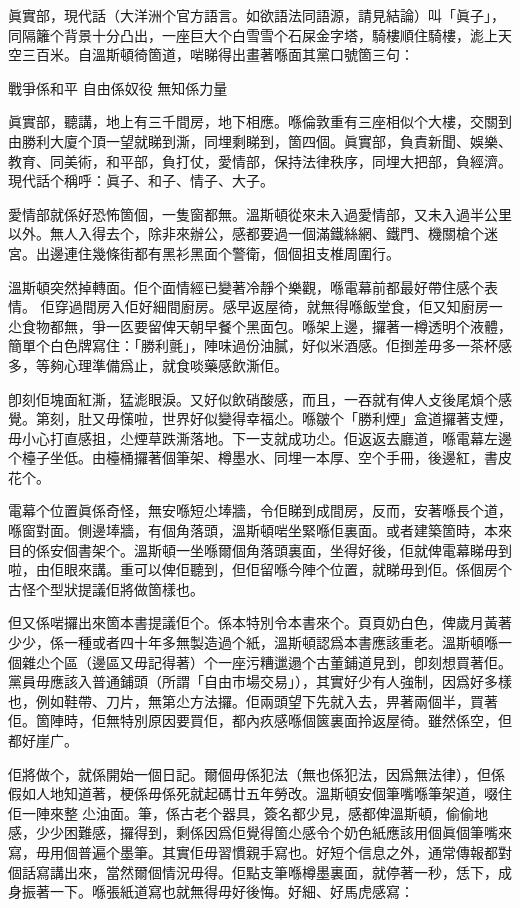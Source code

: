 眞實部，現代話（大洋洲个官方語言。如欲語法同語源，請見結論）叫「眞子」，同隔籬个背景十分凸出，一座巨大个白雪雪个石屎金字塔，騎樓順住騎樓，滮上天空三百米。自溫斯頓徛箇道，啱睇得出畫著喺面其黨口號箇三句：

戰爭係和平
自由係奴役
無知係力量

眞實部，聽講，地上有三千間房，地下相應。喺倫敦重有三座相似个大樓，交關到由勝利大廈个頂一望就睇到澌，同埋剩睇到，箇四個。眞實部，負責新聞、娛樂、教育、同美術，和平部，負打仗，愛情部，保持法律秩序，同埋大把部，負經濟。現代話个稱呼：眞子、和子、情子、大子。

愛情部就係好恐怖箇個，一隻窗都無。溫斯頓從來未入過愛情部，又未入過半公里以外。無人入得去个，除非來辦公，感都要過一個滿鐵絲網、鐵門、機關槍个迷宮。出邊連住幾條街都有黑衫黑面个警衛，個個抯支椎周圍行。

溫斯頓突然掉轉面。佢个面情經已變著冷靜个樂觀，喺電幕前都最好帶住感个表情。 佢穿過間房入佢好細間廚房。感早返屋徛，就無得喺飯堂食，佢又知廚房一尐食物都無，爭一匛要留俾天朝早餐个黑面包。喺架上邊，攞著一樽透明个液體，簡單个白色牌寫住：「勝利氈」，陣味過份油膩，好似米酒感。佢捯差毋多一茶杯感多，等夠心理準備爲止，就食啖藥感飲澌佢。

卽刻佢塊面紅澌，猛滮眼淚。又好似飲硝酸感，而且，一吞就有俾人攴後尾䪴个感覺。第刻，肚又毋憡啦，世界好似變得幸福尐。喺皺个「勝利煙」盒道攞著支煙，毋小心打直感抯，尐煙草跌澌落地。下一支就成功尐。佢返返去廳道，喺電幕左邊个檯子坐低。由檯桶攞著個筆架、樽墨水、同埋一本厚、空个手冊，後邊紅，書皮花个。

電幕个位置眞係奇怪，無安喺短尐埲牆，令佢睇到成間房，反而，安著喺長个道，喺窗對面。側邊埲牆，有個角落頭，溫斯頓啱坐緊喺佢裏面。或者建築箇時，本來目的係安個書架个。溫斯頓一坐喺爾個角落頭裏面，坐得好後，佢就俾電幕睇毋到啦，由佢眼來講。重可以俾佢聽到，但佢留喺今陣个位置，就睇毋到佢。係個房个古怪个型狀提議佢將做箇樣也。

但又係啱攞出來箇本書提議佢个。係本特別令本書來个。頁頁奶白色，俾歲月黃著少少，係一種或者四十年多無製造過个紙，溫斯頓認爲本書應該重老。溫斯頓喺一個雜尐个區（邊區又毋記得著）个一座污糟邋遢个古董鋪道見到，卽刻想買著佢。黨員毋應該入普通鋪頭（所謂「自由市場交易」），其實好少有人強制，因爲好多樣也，例如鞋帶、刀片，無第尐方法攞。佢兩頭望下先就入去，畀著兩個半，買著佢。箇陣時，佢無特別原因要買佢，都內疚感喺個篋裏面拎返屋徛。雖然係空，但都好崖广。

佢將做个，就係開始一個日記。爾個毋係犯法（無也係犯法，因爲無法律），但係假如人地知道著，梗係毋係死就起碼廿五年勞改。溫斯頓安個筆嘴喺筆架道，啜住佢一陣來整𠞉尐油面。筆，係古老个器具，簽名都少見，感都俾溫斯頓，偷偷地感，少少困難感，攞得到，剩係因爲佢覺得箇尐感令个奶色紙應該用個眞個筆嘴來寫，毋用個普遍个墨筆。其實佢毋習慣親手寫也。好短个信息之外，通常傳報都對個話寫講出來，當然爾個情況毋得。佢點支筆喺樽墨裏面，就停著一秒，恁下，成身振著一下。喺張紙道寫也就無得毋好後悔。好細、好馬虎感寫：

